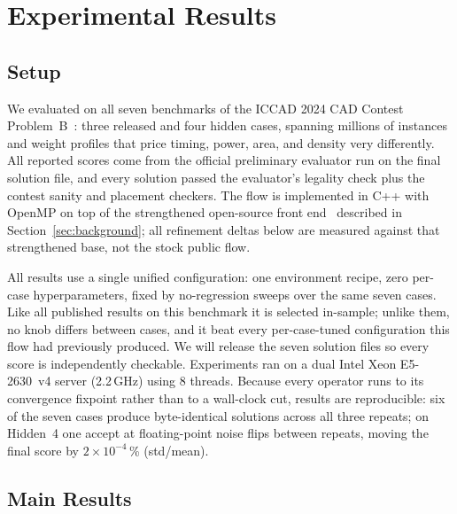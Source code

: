 \section{Experimental Results}\label{sec:experiments}

\subsection{Setup}\label{sec:setup}

We evaluated on all seven benchmarks of the ICCAD 2024 CAD Contest Problem~B~\cite{yang2024contest,fang2024overview}: three released and four hidden cases, spanning millions of instances and weight profiles that price timing, power, area, and density very differently. All reported scores come from the official preliminary evaluator run on the final solution file, and every solution passed the evaluator's legality check plus the contest sanity and placement checkers. The flow is implemented in C++ with OpenMP on top of the strengthened open-source front end~\cite{baselineRepo} described in Section~\ref{sec:background}; all refinement deltas below are measured against that strengthened base, not the stock public flow.

All results use a single unified configuration: one environment recipe, zero per-case hyperparameters, fixed by no-regression sweeps over the same seven cases. Like all published results on this benchmark it is selected in-sample; unlike them, no knob differs between cases, and it beat every per-case-tuned configuration this flow had previously produced. We will release the seven solution files so every score is independently checkable. Experiments ran on a dual Intel Xeon E5-2630~v4 server (2.2\,GHz) using 8 threads. Because every operator runs to its convergence fixpoint rather than to a wall-clock cut, results are reproducible: six of the seven cases produce byte-identical solutions across all three repeats; on Hidden~4 one accept at floating-point noise flips between repeats, moving the final score by $2{\times}10^{-4}$\,\% (std/mean).

\subsection{Main Results}\label{sec:mainresults}

